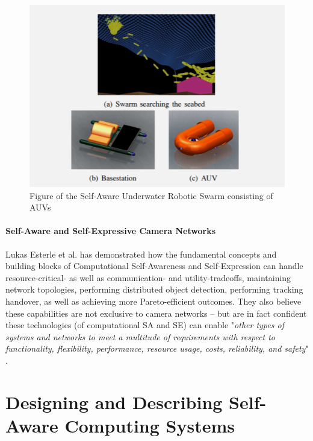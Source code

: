\documentclass{article}
\begin{document}
\begin{figure}[!ht]
\centering
\includegraphics[width=0.8\columnwidth]{Assets/pics/cocoro.PNG}
\caption{Figure of the Self-Aware Underwater Robotic Swarm consisting of AUVs}
\label{fig:cocoro}
\end{figure}

\paragraph{Self-Aware and Self-Expressive Camera Networks}

Lukas Esterle et al. \cite{esterle_camera} has demonstrated how the fundamental concepts and building blocks of Computational Self-Awareness and Self-Expression can handle resource-critical- as well as communication- and utility-tradeoffs, maintaining network topologies, performing distributed object detection, performing tracking handover, as well as achieving more Pareto-efficient outcomes. They also believe these capabilities are not exclusive to camera networks -- but are in fact confident these technologies (of computational SA and SE) can enable "\textit{other types of systems and networks to meet a multitude of requirements with respect to functionality, flexibility, performance, resource usage, costs, reliability, and safety}" \cite{esterle_camera}.










\section{Designing and Describing Self-Aware Computing Systems}
\end{document}
